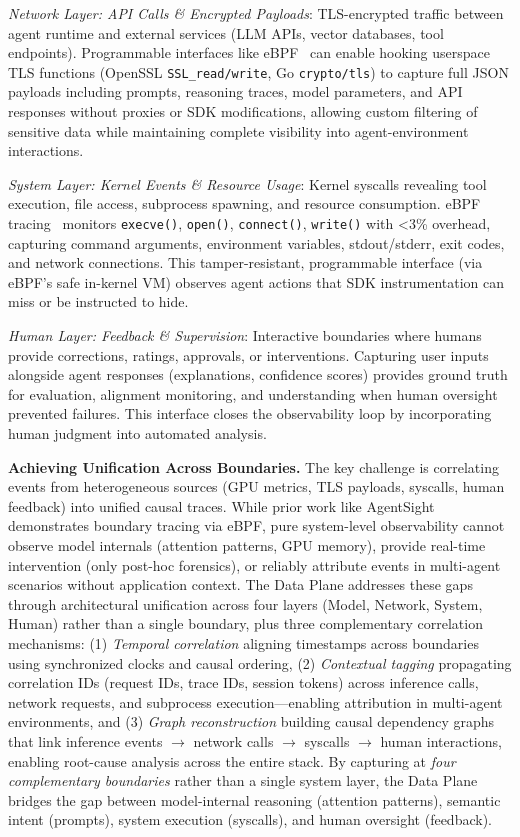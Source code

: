 \documentclass[sigplan,screen,9pt]{acmart}
\begin{document}
\emph{Network Layer: API Calls \& Encrypted Payloads}: TLS-encrypted traffic between agent runtime and external services (LLM APIs, vector databases, tool endpoints). Programmable interfaces like eBPF~\cite{zheng2025extending} can enable hooking userspace TLS functions (OpenSSL \texttt{SSL\_read/write}, Go \texttt{crypto/tls}) to capture full JSON payloads including prompts, reasoning traces, model parameters, and API responses without proxies or SDK modifications, allowing custom filtering of sensitive data while maintaining complete visibility into agent-environment interactions.

\emph{System Layer: Kernel Events \& Resource Usage}: Kernel syscalls revealing tool execution, file access, subprocess spawning, and resource consumption. eBPF tracing~\cite{brendangregg,ebpfio} monitors \texttt{execve()}, \texttt{open()}, \texttt{connect()}, \texttt{write()} with <3\% overhead, capturing command arguments, environment variables, stdout/stderr, exit codes, and network connections. This tamper-resistant, programmable interface (via eBPF's safe in-kernel VM) observes agent actions that SDK instrumentation can miss or be instructed to hide.

\emph{Human Layer: Feedback \& Supervision}: Interactive boundaries where humans provide corrections, ratings, approvals, or interventions. Capturing user inputs alongside agent responses (explanations, confidence scores) provides ground truth for evaluation, alignment monitoring, and understanding when human oversight prevented failures. This interface closes the observability loop by incorporating human judgment into automated analysis.

\textbf{Achieving Unification Across Boundaries.} The key challenge is correlating events from heterogeneous sources (GPU metrics, TLS payloads, syscalls, human feedback) into unified causal traces. While prior work like AgentSight~\cite{zheng2025agentsight} demonstrates boundary tracing via eBPF, pure system-level observability cannot observe model internals (attention patterns, GPU memory), provide real-time intervention (only post-hoc forensics), or reliably attribute events in multi-agent scenarios without application context. The Data Plane addresses these gaps through architectural unification across four layers (Model, Network, System, Human) rather than a single boundary, plus three complementary correlation mechanisms: (1) \emph{Temporal correlation} aligning timestamps across boundaries using synchronized clocks and causal ordering, (2) \emph{Contextual tagging} propagating correlation IDs (request IDs, trace IDs, session tokens) across inference calls, network requests, and subprocess execution---enabling attribution in multi-agent environments, and (3) \emph{Graph reconstruction} building causal dependency graphs that link inference events $\rightarrow$ network calls $\rightarrow$ syscalls $\rightarrow$ human interactions, enabling root-cause analysis across the entire stack. By capturing at \emph{four complementary boundaries} rather than a single system layer, the Data Plane bridges the gap between model-internal reasoning (attention patterns), semantic intent (prompts), system execution (syscalls), and human oversight (feedback).
\end{document}
